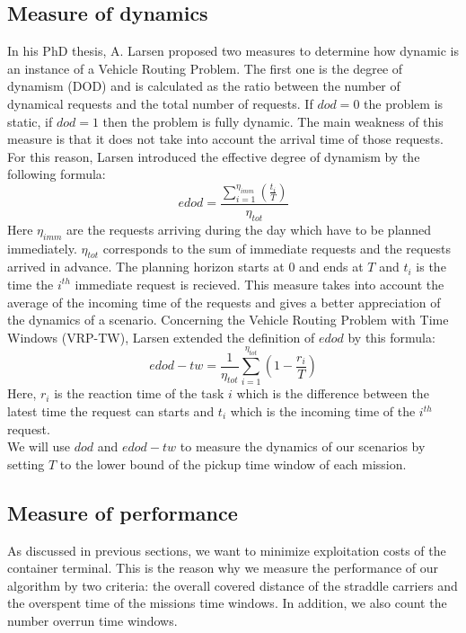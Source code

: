 \documentclass[a4paper,10pt]{article}
\begin{document}
	\subsection{Measure of dynamics}
In his PhD thesis\cite{Larsen00}, A. Larsen proposed two measures to determine how dynamic is an instance of a Vehicle Routing Problem. The first one is the degree of dynamism (DOD) and is calculated as the ratio between the number of dynamical requests and the total number of requests. If $dod=0$ the problem is static, if $dod=1$ then the problem is fully dynamic. The main weakness of this measure is that it does not take into account the arrival time of those requests. For this reason, Larsen introduced the effective degree of dynamism by the following formula: 
\begin{equation*}
 edod = \frac{\sum_{i=1}^{\eta_{imm}}\left(\frac{t_i}{T}\right)}{\eta_{tot}}
\end{equation*}
Here $\eta_{imm}$ are the requests arriving during the day which have to be planned immediately. $\eta_{tot}$ corresponds to the sum of immediate requests and the requests arrived in advance. The planning horizon starts at $0$ and ends at $T$ and $t_i$ is the time the $i^{th}$ immediate request is recieved. This measure takes into account the average of the incoming time of the requests and gives a better appreciation of the dynamics of a scenario.
Concerning the Vehicle Routing Problem with Time Windows (VRP-TW), Larsen extended the definition of $edod$ by this formula: 
\begin{equation*}
 edod-tw = \frac{1}{\eta_{tot}} \sum_{i=1}^{\eta_{tot}} \left(1 - \frac{r_i}{T}\right)
\end{equation*}
Here, $r_i$ is the reaction time of the task $i$ which is the difference between the latest time the request can starts and $t_i$ which is the incoming time of the $i^{th}$ request.\\

We will use $dod$ and $edod-tw$ to measure the dynamics of our scenarios by setting $T$ to the lower bound of the pickup time window of each mission.

	\subsection{Measure of performance}
As discussed in previous sections, we want to minimize exploitation costs of the container terminal. This is the reason why we measure the performance of our algorithm by two criteria: the overall covered distance of the straddle carriers and the overspent time of the missions time windows. In addition, we also count the number overrun time windows.
\end{document}
